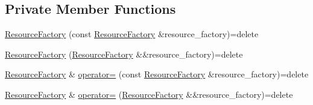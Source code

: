 \subsection*{Private Member Functions}
\begin{DoxyCompactItemize}
\item 
\hyperlink{classmage_1_1_resource_factory_ac2d236ed7dc16f4ab87d9d8e95d78a94}{Resource\+Factory} (const \hyperlink{classmage_1_1_resource_factory}{Resource\+Factory} \&resource\+\_\+factory)=delete
\item 
\hyperlink{classmage_1_1_resource_factory_ab4e46a6c9ac15d1584c6e28bb1e65708}{Resource\+Factory} (\hyperlink{classmage_1_1_resource_factory}{Resource\+Factory} \&\&resource\+\_\+factory)=delete
\item 
\hyperlink{classmage_1_1_resource_factory}{Resource\+Factory} \& \hyperlink{classmage_1_1_resource_factory_a1a99724dd744fde5ce2a1488966b30d0}{operator=} (const \hyperlink{classmage_1_1_resource_factory}{Resource\+Factory} \&resource\+\_\+factory)=delete
\item 
\hyperlink{classmage_1_1_resource_factory}{Resource\+Factory} \& \hyperlink{classmage_1_1_resource_factory_a4a1a0c064f068329f4b94c47ec17046f}{operator=} (\hyperlink{classmage_1_1_resource_factory}{Resource\+Factory} \&\&resource\+\_\+factory)=delete
\end{DoxyCompactItemize}
